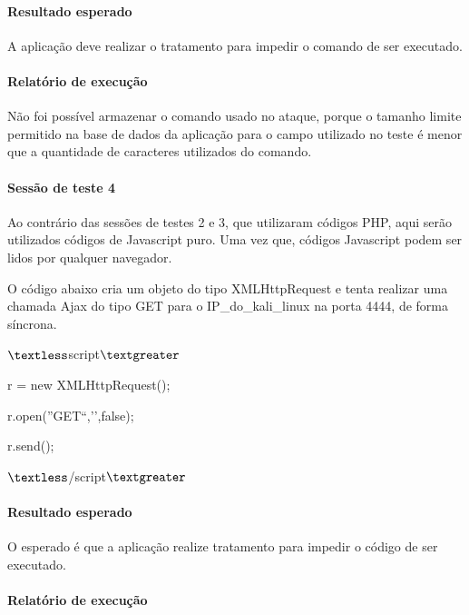 \documentclass[
    12pt,               %
    openright,          %
    oneside,            %
    a4paper,            %
    section=TITLE,     %
    english,            %
    french,             %
    spanish,            %
    brazil              %
    ]{abntex2}
\begin{document}
\paragraph*{Resultado esperado}

A aplicação deve realizar o tratamento para impedir o comando de ser executado.



\paragraph*{Relatório de execução}

Não foi possível armazenar o comando usado no ataque, porque o tamanho limite permitido na base de dados da aplicação para o campo utilizado no teste é menor que a quantidade de caracteres utilizados do comando.



\paragraph*{Sessão de teste 4}

Ao contrário das sessões de testes 2 e 3, que utilizaram códigos PHP, aqui serão utilizados códigos de Javascript puro. Uma vez que, códigos Javascript podem ser lidos por qualquer navegador.


O código abaixo cria um objeto do tipo XMLHttpRequest e tenta realizar uma chamada Ajax do tipo GET para o IP\_do\_kali\_linux na porta 4444, de forma síncrona.


$\textless$script$\textgreater$


r = new XMLHttpRequest();


r.open(''GET``,\rq{}\rq{},false);


r.send();


$\textless$/script$\textgreater$



\paragraph*{Resultado esperado}

O esperado é que a aplicação realize tratamento para impedir o código de ser executado.



\paragraph*{Relatório de execução}
\end{document}

